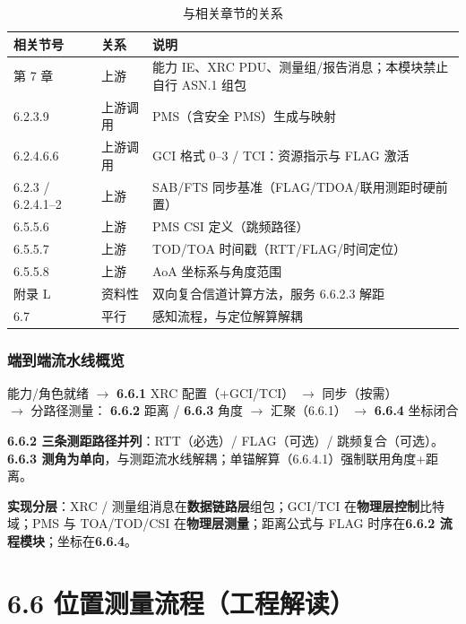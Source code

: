 \documentclass[11pt,a4paper]{ctexart}
\begin{document}
\begin{longtable}{L{2.6cm}L{1.8cm}L{9cm}}
\caption{与相关章节的关系\label{tab:66-rel}} \\
\toprule
\textbf{相关节号} & \textbf{关系} & \textbf{说明} \\
\midrule
第 7 章 & 上游 & 能力 IE、XRC PDU、测量组/报告消息；本模块禁止自行 ASN.1 组包 \\
6.2.3.9 & 上游调用 & PMS（含安全 PMS）生成与映射 \\
6.2.4.6.6 & 上游调用 & GCI 格式 0--3 / TCI：资源指示与 FLAG 激活 \\
6.2.3 / 6.2.4.1--2 & 上游 & SAB/FTS 同步基准（FLAG/TDOA/联用测距时硬前置） \\
6.5.5.6 & 上游 & PMS CSI 定义（跳频路径） \\
6.5.5.7 & 上游 & TOD/TOA 时间戳（RTT/FLAG/时间定位） \\
6.5.5.8 & 上游 & AoA 坐标系与角度范围 \\
附录 L & 资料性 & 双向复合信道计算方法，服务 6.6.2.3 解距 \\
6.7 & 平行 & 感知流程，与定位解算解耦 \\
\bottomrule
\end{longtable}

\section{端到端流水线概览}

\begin{center}
\small
能力/角色就绪
$\rightarrow$ \textbf{6.6.1} XRC 配置（+GCI/TCI）
$\rightarrow$ 同步（按需）\\[0.3em]
$\rightarrow$ 分路径测量：
\textbf{6.6.2} 距离 / \textbf{6.6.3} 角度
$\rightarrow$ 汇聚（6.6.1）
$\rightarrow$ \textbf{6.6.4} 坐标闭合
\end{center}

\textbf{6.6.2 三条测距路径并列}：RTT（必选）/ FLAG（可选）/ 跳频复合（可选）。\textbf{6.6.3 测角为单向}，与测距流水线解耦；单锚解算（6.6.4.1）强制联用角度+距离。

\textbf{实现分层}：XRC / 测量组消息在\textbf{数据链路层}组包；GCI/TCI 在\textbf{物理层控制}比特域；PMS 与 TOA/TOD/CSI 在\textbf{物理层测量}；距离公式与 FLAG 时序在\textbf{6.6.2 流程模块}；坐标在\textbf{6.6.4}。

\newpage


\part{6.6 位置测量流程（工程解读）}
\end{document}
